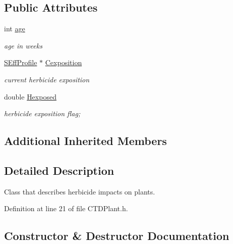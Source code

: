 \subsection*{Public Attributes}
\begin{DoxyCompactItemize}
\item 
\mbox{\label{class_c_t_d_plant_acdc8db83f80c17bbe5a6064cf9376aa3}} 
int \mbox{\hyperlink{class_c_t_d_plant_acdc8db83f80c17bbe5a6064cf9376aa3}{age}}
\begin{DoxyCompactList}\small\item\em age in weeks \end{DoxyCompactList}\item 
\mbox{\label{class_c_t_d_plant_a2bc2e8058517e3a403862b8ead6cc5d3}} 
\mbox{\hyperlink{struct_s_eff_profile}{S\+Eff\+Profile}} $\ast$ \mbox{\hyperlink{class_c_t_d_plant_a2bc2e8058517e3a403862b8ead6cc5d3}{Cexposition}}
\begin{DoxyCompactList}\small\item\em current herbicide exposition \end{DoxyCompactList}\item 
\mbox{\label{class_c_t_d_plant_a09caa9d708b3568b9c6e49294fe31dba}} 
double \mbox{\hyperlink{class_c_t_d_plant_a09caa9d708b3568b9c6e49294fe31dba}{Hexposed}}
\begin{DoxyCompactList}\small\item\em herbicide exposition flag; \end{DoxyCompactList}\end{DoxyCompactItemize}
\subsection*{Additional Inherited Members}


\subsection{Detailed Description}
Class that describes herbicide impacts on plants. 

Definition at line 21 of file C\+T\+D\+Plant.\+h.



\subsection{Constructor \& Destructor Documentation}
\mbox{\label{class_c_t_d_plant_ad106f3466ae0f30e6d84c3bfe71dd4db}} 
